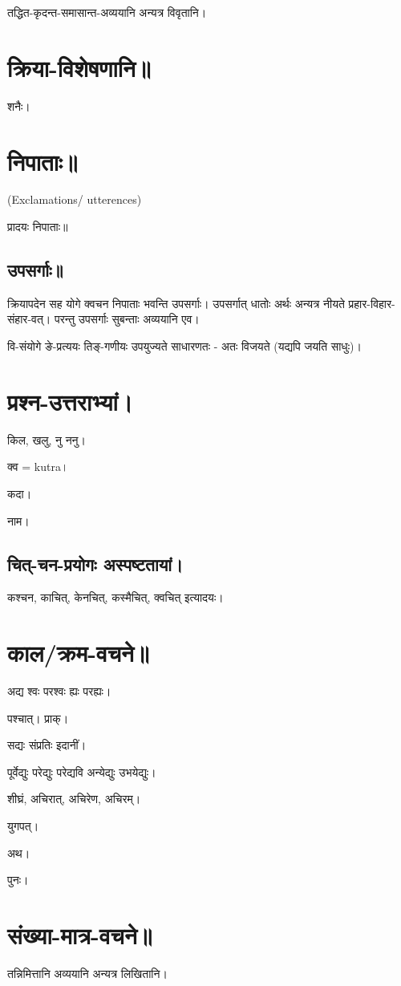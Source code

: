 \documentclass[oneside, article]{memoir}
\begin{document}
तद्धित-कृदन्त-समासान्त-अव्ययानि अन्यत्र विवृतानि।

\section{क्रिया-विशेषणानि॥}
शनैः।



\section{निपाताः॥}
(Exclamations/ utterences)

प्रादयः निपाताः॥

\subsection{उपसर्गाः॥}
क्रियापदेन सह योगे क्वचन निपाताः भवन्ति उपसर्गाः। उपसर्गात् धातोः अर्थः अन्यत्र नीयते प्रहार-विहार-संहार-वत्। परन्तु उपसर्गाः सुबन्ताः अव्ययानि एव।

\tbc

वि-संयोगे ङे-प्रत्ययः तिङ्-गणीयः उपयुज्यते साधारणतः - अतः विजयते (यद्यपि जयति साधुः)।

\section{प्रश्न-उत्तराभ्यां।}
किल, खलु, नु ननु।

क्व = kutra।

कदा।

नाम।

\subsection{चित्-चन-प्रयोगः अस्पष्टतायां।}
कश्चन, काचित्, केनचित्, कस्मैचित्, क्वचित् इत्यादयः।

\section{काल/क्रम-वचने॥}
अद्य श्वः परश्वः ह्यः परह्यः।

पश्चात्। प्राक्।

सद्यः संप्रतिः इदानीं।

पूर्वेद्युः परेद्युः परेद्यवि अन्येद्युः उभयेद्युः।

शीघ्रं, अचिरात्, अचिरेण, अचिरम्।

युगपत्।

अथ।

पुनः।

\section{संख्या-मात्र-वचने॥}
तन्निमित्तानि अव्ययानि अन्यत्र लिखितानि।
\end{document}
